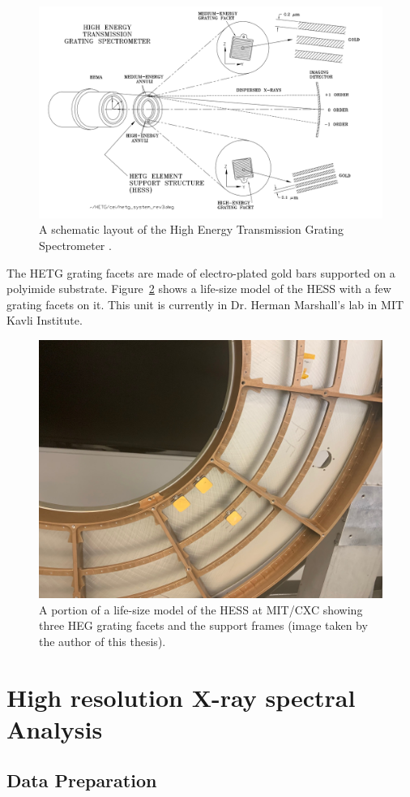 \begin{figure}
    \centering
    \includegraphics[width = 0.6\linewidth]{Chapters/Figures/hetgs.png}
    \caption{A schematic layout of the High Energy Transmission Grating Spectrometer \citep{ChandraMSFC}.}
    \label{hetgs}
\end{figure}

The HETG grating facets are made of electro-plated gold bars supported on a polyimide substrate. Figure~\ref{facet} shows a life-size model of the HESS with a few grating facets on it. This unit is currently in Dr. Herman Marshall's lab in MIT Kavli Institute.



\begin{figure}
    \centering
    \includegraphics[width = 0.6\linewidth]{Chapters/Figures/facet.jpg}
    \caption{A portion of a life-size model of the HESS at MIT/CXC showing three HEG grating facets and the support frames (image taken by the author of this thesis).}
    \label{facet}
\end{figure}




\section{High resolution X-ray spectral Analysis}
\subsection{Data Preparation}

